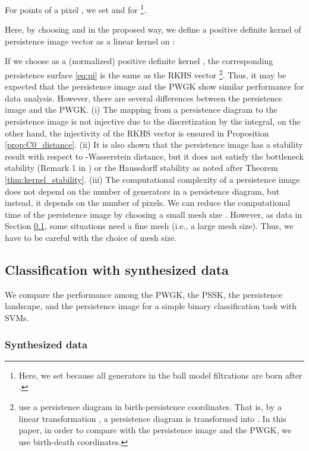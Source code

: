 \documentclass{article}
\begin{document}
For points  of a pixel , we set  and  for \footnote{Here, we set  because all generators in the ball model filtrations are born after .}.

Here, by choosing  and  in the proposed way, we define a positive definite kernel of persistence image vector as a linear kernel on :


If we choose  as a (normalized) positive definite kernel , the corresponding persistence surface \eqref{eq:pi} is the same as the RKHS vector \footnote{\cite{AEKNPSCHMZ17} use a persistence diagram in birth-persistence coordinates. That is, by a linear transformation , a persistence diagram  is transformed into . In this paper, in order to compare with the persistence image and the PWGK, we use birth-death coordinates.}.
Thus, it may be expected that the persistence image and the PWGK show similar performance for data analysis.
However, there are several differences between the persistence image and the PWGK.
(i) The mapping from a persistence diagram to the persistence image is not injective due to the discretization by the integral, on the other hand, the injectivity of the RKHS vector  is ensured in Proposition \ref{prop:C0_distance}.
(ii) It is also shown that the persistence image has a stability result with respect to -Wasserstein distance, but it does not satisfy the bottleneck stability (Remark 1 in \cite{AEKNPSCHMZ17}) or the Haussdorff stability as noted after Theorem \ref{thm:kernel_stability}.
(iii) The computational complexity of a persistence image does not depend on the number of generators in a persistence diagram, but instead, it depends on the number of pixels. We can reduce the computational time of the persistence image by choosing a small mesh size . However, as data in Section \ref{subsec:Synthesized}, some situations need a fine mesh (i.e., a large mesh size). Thus, we have to be careful with the choice of mesh size.


\subsection{Classification with synthesized data}
\label{subsec:Synthesized}
We compare the performance among the PWGK, the PSSK, the persistence landscape, and the persistence image for a simple binary classification task with SVMs.

\subsubsection{Synthesized data}  
\end{document}
